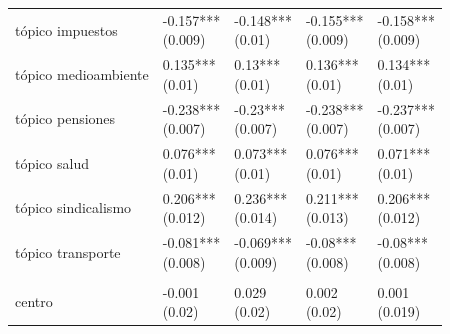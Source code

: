 \documentclass[
  12pt,
]{article}
\begin{document}
\begin{table}[H]
\begin{threeparttable}
\begin{tabular}[t]{lllll}
\hspace{1em}tópico impuestos & \makecell[l]{-0.157***\\ (0.009)} & \makecell[l]{-0.148***\\ (0.01)} & \makecell[l]{-0.155***\\ (0.009)} & \makecell[l]{-0.158***\\ (0.009)}\\
\hspace{1em}tópico medioambiente & \makecell[l]{0.135***\\ (0.01)} & \makecell[l]{0.13***\\ (0.01)} & \makecell[l]{0.136***\\ (0.01)} & \makecell[l]{0.134***\\ (0.01)}\\
\hspace{1em}tópico pensiones & \makecell[l]{-0.238***\\ (0.007)} & \makecell[l]{-0.23***\\ (0.007)} & \makecell[l]{-0.238***\\ (0.007)} & \makecell[l]{-0.237***\\ (0.007)}\\
\hspace{1em}tópico salud & \makecell[l]{0.076***\\ (0.01)} & \makecell[l]{0.073***\\ (0.01)} & \makecell[l]{0.076***\\ (0.01)} & \makecell[l]{0.071***\\ (0.01)}\\
\hspace{1em}tópico sindicalismo & \makecell[l]{0.206***\\ (0.012)} & \makecell[l]{0.236***\\ (0.014)} & \makecell[l]{0.211***\\ (0.013)} & \makecell[l]{0.206***\\ (0.012)}\\
\hspace{1em}tópico transporte & \makecell[l]{-0.081***\\ (0.008)} & \makecell[l]{-0.069***\\ (0.009)} & \makecell[l]{-0.08***\\ (0.008)} & \makecell[l]{-0.08***\\ (0.008)}\\
\addlinespace[0.3em]
\multicolumn{5}{l}{\textbf{Posicionamiento político}}\\
\hspace{1em}centro & \makecell[l]{-0.001\\ (0.02)} & \makecell[l]{0.029\\ (0.02)} & \makecell[l]{0.002\\ (0.02)} & \makecell[l]{0.001\\ (0.019)}\\

\end{tabular}
\end{threeparttable}
\end{table}
\end{document}
